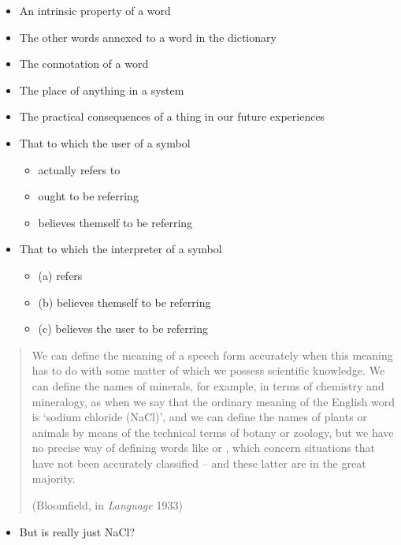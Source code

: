 \documentclass[a4paper,landscape,headrule,footrule,xetex,25pt]{foils}
\begin{document}
\begin{itemize}
\item An intrinsic property of a word
\item The other words annexed to a word in the dictionary
\item The connotation of a word
\item The place of anything in a system
\item The practical consequences of a thing in our future experiences
\newpage
\item That to which the user of a symbol
  \begin{itemize}
  \item actually refers to
  \item ought to be referring
  \item believes themself to be referring
  \end{itemize}
\item That to which the interpreter of a symbol
  \begin{itemize}
  \item (a) refers
  \item (b) believes themself to be referring
  \item (c) believes the user to be referring
  \end{itemize}
\end{itemize}

\begin{quotation}
  We can define the meaning of a speech form accurately when this
  meaning has to do with some matter of which we possess scientific
  knowledge. We can define the names of minerals, for example, in
  terms of chemistry and mineralogy, as when we say that the ordinary
  meaning of the English word  is `sodium chloride (NaCl)', and we
  can define the names of plants or animals by means of the technical
  terms of botany or zoology, but we have no precise way of defining
  words like  or , which concern situations that have not been
  accurately classified – and these latter are in the great majority.
				
\hfill				(Bloomfield, in \textit{Language} 1933)
\end{quotation}

\begin{itemize}
\item But is  really just NaCl?
\end{itemize}

\end{document}
